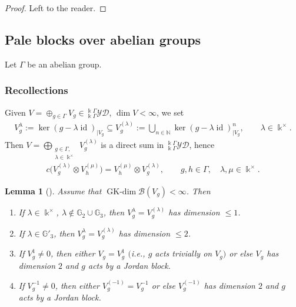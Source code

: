 \documentclass[pdftex]{sigma}
\numberwithin{equation}{section}
\newtheorem{Lemma}[Theorem]{Lemma}
\newcommand{\GK}{\operatorname{GK-dim}}
\newcommand{\id}{\operatorname{id}}
\newcommand{\toba}{\mathscr B}
\newcommand{\G}{{\mathbb G}}
\newcommand{\N}{{\mathbb N}}
\newcommand{\yd}[1]{{}_{#1}^{#1}\mathcal{YD}}
\begin{document}
\begin{proof}
Left to the reader.
\end{proof}

\subsection{Pale blocks over abelian groups}%
Let $\Gamma$ be an abelian group.

\subsubsection{Recollections}%
Given $V = \oplus_{g\in \Gamma} V_g \in \yd{\Bbbk\Gamma}$, $\dim V < \infty$, we set
\begin{gather*}
V_g^{\lambda} := \ker (g - \lambda \id)_{\vert V_g} \subseteq V_g^{(\lambda)}
:= \bigcup_{n\in \N} \ker (g - \lambda \id)^n_{\vert V_g}, \qquad
\lambda \in \Bbbk^{\times}.
\end{gather*}
Then $V = \bigoplus_{\substack{g\in \Gamma, \\ \lambda \in \Bbbk^{\times}}} V_g^{(\lambda)}$ is a direct sum in $\yd{\Bbbk\Gamma}$, hence
\begin{align*}
c\big(V_g^{(\lambda)} \otimes V_h^{(\mu)}\big) = V_h^{(\mu)} \otimes V_g^{(\lambda)}, \qquad
g, h \in \Gamma,\quad \lambda,\mu \in \Bbbk^{\times}.
\end{align*}

\begin{Lemma}[{\cite[Lemma 8.1.1]{AAH-triang}}]%
Assume that $\GK \toba(V_g)< \infty$. Then
\begin{enumerate}[label=$(\alph*)$]\itemsep=0pt
\item%
If $\lambda \in \Bbbk^{\times}$, $\lambda \notin \G_2 \cup \G_3$, then
$V_g^{\lambda} = V_g^{(\lambda)}$ has dimension $\leq 1$.

\item%
If $\lambda \in \G'_3$, then
$V_g^{\lambda} = V_g^{(\lambda)}$ has dimension $\leq 2$.

\item%
If $V_g^{1} \neq 0$, then either
$V_g = V_g^{1}$ $($i.e., $g$ acts trivially on $V_g)$ or else $V_g$ has dimension $2$ and $g$ acts by a Jordan block.

\item%
If $V_g^{-1} \neq 0$, then either
$V_g^{(-1)} = V_g^{-1}$ or else $V_g^{(-1)}$ has dimension $2$ and $g$ acts by a Jordan block.
\end{enumerate}
\end{Lemma}
\end{document}
